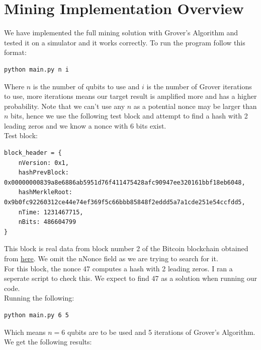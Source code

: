 \documentclass[11pt]{article} %
\begin{document}
\section{Mining Implementation Overview}{}
We have implemented the full mining solution with Grover's Algorithm and tested it on a simulator and it works correctly. To run the program follow this format:

\begin{verbatim}
python main.py n i
\end{verbatim}

\noindent Where $n$ is the number of qubits to use and $i$ is the number of Grover iterations to use, more iterations means our target result is amplified more and has a higher probability. Note that we can't use any $n$ as a potential nonce may be larger than $n$ bits, hence we use the following test block and attempt to find a hash with 2 leading zeros and we know a nonce with 6  bits exist.\\

\noindent Test block:
\begin{verbatim}
block_header = {
    nVersion: 0x1,
    hashPrevBlock: 0x00000000839a8e6886ab5951d76f411475428afc90947ee320161bbf18eb6048,
    hashMerkleRoot: 0x9b0fc92260312ce44e74ef369f5c66bbb85848f2eddd5a7a1cde251e54ccfdd5,
    nTime: 1231467715,
    nBits: 486604799
}
\end{verbatim}

\noindent This block is real data from block number 2 of the Bitcoin blockchain obtained from \href{https://www.blockchain.com/btc/block/2}{here}. We omit the nNonce field as we are trying to search for it.\\

\noindent For this block, the nonce 47 computes a hash with 2 leading zeros. I ran a seperate script to check this. We expect to find 47 as a solution when running our code.\\

\noindent Running the following:

\begin{verbatim}
python main.py 6 5
\end{verbatim}

\noindent Which means $n = 6$ qubits are to be used and 5 iterations of Grover's Algorithm. We get the following results:
\end{document}
